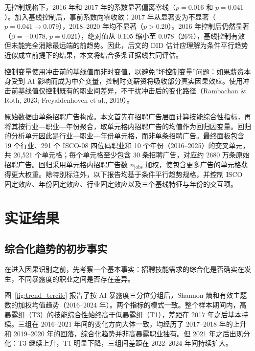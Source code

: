 \documentclass[12pt, a4paper]{article}
\begin{document}
无控制规格下，2016 年和 2017 年的系数显著偏离零线（$p = 0.016$ 和 $p = 0.041$）。加入基线控制后，事前系数向零收敛：2017 年从显著变为不显著（$p = 0.041 \to 0.079$），2018--2020 年均不显著（$p > 0.20$）。2016 年控制后仍然显著（$\beta = -0.078$, $p = 0.021$），绝对值从 $0.105$ 缩小至 $0.078$（26\%），基线控制有效但未能完全消除最远端的前趋势。因此，后文的 DID 估计应理解为条件平行趋势近似成立前提下的结果，本文将结合多条证据线共同评估。

控制变量使用冲击前的基线值而非时变值，以避免”坏控制变量”问题：如果薪资本身受到 AI 影响而成为中介变量，控制时变薪资将吸收部分真实因果效应。使用冲击前基线值仅控制既有的职业间差异，不干扰冲击后的变化路径（Rambachan \& Roth, 2023; Freyaldenhoven et al., 2019）。

原始数据由单条招聘广告构成。本文首先在招聘广告层面计算技能综合性指标，再将其按行业—职业—年份聚合，取单元格内招聘广告的均值作为回归因变量。回归的分析单元因此是行业—职业—年份单元格，而非单条招聘广告。最终面板包含 19 个行业、291 个 ISCO-08 四位码职业和 10 个年份（2016--2025）的交叉单元，共 20,521 个单元格；每个单元格至少包含 30 条招聘广告，对应约 2680 万条原始招聘广告。回归采用单元格内招聘广告数 $n_{\text{jobs}}$ 加权，使包含更多广告的单元格获得更大权重。除特别标注外，以下报告均基于条件平行趋势规格，并控制 ISCO 固定效应、年份固定效应、行业固定效应以及三个基线特征与年份的交互项。

\section{实证结果}

\subsection{综合化趋势的初步事实}

在进入因果识别之前，先考察一个基本事实：招聘技能需求的综合化是否确实在发生，不同暴露度的职业之间是否存在差异。

图~\ref{fig:trend_tercile} 报告了按 AI 暴露度三分位分组后，Shannon 熵和有效主题数的加权均值趋势（2016--2024 年）。两个指标的模式一致。整个样本期间内，高暴露组（T3）的技能综合性始终高于低暴露组（T1），差距在 2017 年之后基本持续。三组在 2016--2021 年间的变化方向大体一致，均经历了 2017--2018 年的上升和 2019--2020 年的回落，综合化趋势并非高暴露职业独有。但 2021 年之后出现分化：T3 继续上升，T1 明显下降，三组间差距在 2022--2024 年间持续扩大。
\end{document}
